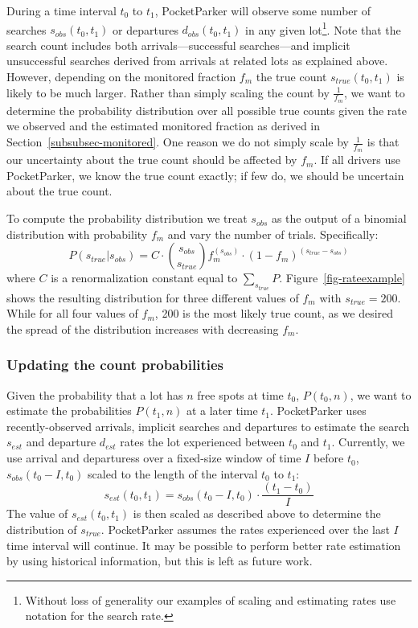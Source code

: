 During a time interval $t_0$ to $t_1$, PocketParker will observe some number
of searches $s_{obs}(t_0, t_1)$ or departures $d_{obs}(t_0, t_1)$ in any
given lot\footnote{Without loss of generality our examples of scaling and
estimating rates use notation for the search rate.}. Note that the search
count includes both arrivals---successful searches---and implicit
unsuccessful searches derived from arrivals at related lots as explained
above. However, depending on the monitored fraction $f_m$ the true count
$s_{true}(t_0, t_1)$ is likely to be much larger. Rather than simply scaling
the count by $\frac{1}{f_m}$, we want to determine the probability
distribution over all possible true counts given the rate we observed and the
estimated monitored fraction as derived in Section~\ref{subsubsec-monitored}.
One reason we do not simply scale by $\frac{1}{f_m}$ is that our uncertainty
about the true count should be affected by $f_m$. If all drivers use
PocketParker, we know the true count exactly; if few do, we should be
uncertain about the true count.

To compute the probability distribution we treat $s_{obs}$ as the output of a
binomial distribution with probability $f_m$ and vary the number of trials.
Specifically:
%
\begin{equation} P(s_{true}| s_{obs}) = C \cdot {s_{obs} \choose s_{true}}
f_m^{(s_{obs})} \cdot (1 - f_m)^{(s_{true} - s_{obs})} \end{equation}
%
where $C$ is a renormalization constant equal to $\sum_{s_{true}} P$.
Figure~\ref{fig-rateexample} shows the resulting distribution for three
different values of $f_m$ with $s_{true} = 200$. While for all four values of
$f_m$, 200 is the most likely true count, as we desired the spread of the
distribution increases with decreasing $f_m$.

\subsubsection{Updating the count probabilities}

Given the probability that a lot has $n$ free spots at time $t_0$, $P(t_0,
n)$, we want to estimate the probabilities $P(t_1, n)$ at a later time $t_1$.
PocketParker uses recently-observed arrivals, implicit searches and
departures to estimate the search $s_{est}$ and departure $d_{est}$ rates the
lot experienced between $t_0$ and $t_1$. Currently, we use arrival and
departuress over a fixed-size window of time $I$ before $t_0$, $s_{obs}(t_0 -
I, t_0)$ scaled to the length of the interval $t_0$ to $t_1$:
%
\[s_{est}(t_0, t_1) = s_{obs}(t_0 - I, t_0) \cdot \frac{(t_1 - t_0)}{I} \]
%
The value of $s_{est}(t_0, t_1)$ is then scaled as described above to
determine the distribution of $s_{true}$. PocketParker assumes the rates
experienced over the last $I$ time interval will continue. It may be possible
to perform better rate estimation by using historical information, but this
is left as future work.

